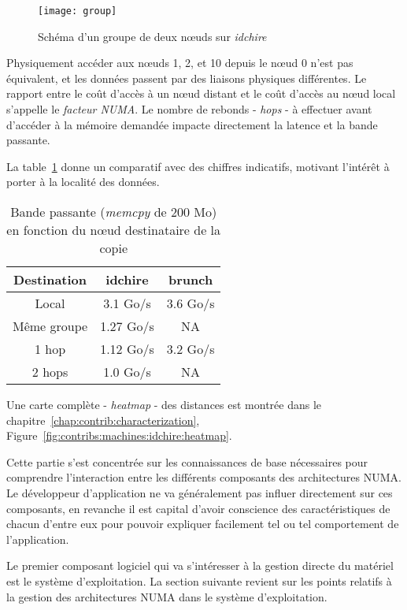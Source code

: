 \begin{figure}[ht]
  \centering
  \texttt{[image: group]}
  \caption{Schéma d'un groupe de deux nœuds sur \emph{idchire}}\label{fig:context:group-idchire}
\end{figure}


Physiquement accéder aux nœuds 1, 2, et 10 depuis le nœud 0 n'est pas équivalent, et les données passent par des liaisons physiques différentes.
Le rapport entre le coût d'accès à un nœud distant et le coût d'accès au nœud local s'appelle le \emph{facteur NUMA}.
Le nombre de rebonds - \emph{hops} - à effectuer avant d'accéder à la mémoire demandée impacte directement la latence et la bande passante.

La table~\ref{tab:topologie-hops} donne un comparatif avec des chiffres indicatifs, motivant l'intérêt à porter à la localité des données.

\begin{table}[ht]
\def\arraystretch{1.5}
\centering
\begin{tabular}{|c||c|c|}\hline
  Destination & idchire & brunch  \\ \hline
 Local & 3.1 Go/s & 3.6 Go/s \\ \hline
 Même groupe & 1.27 Go/s & NA \\ \hline
 1 hop & 1.12 Go/s & 3.2 Go/s \\ \hline
 2 hops & 1.0 Go/s & NA \\ \hline
\end{tabular}
\caption{Bande passante (\emph{memcpy} de 200 Mo) en fonction du nœud destinataire de la copie}\label{tab:topologie-hops}
\end{table}

Une carte complète - \emph{heatmap} - des distances est montrée dans le chapitre~\ref{chap:contrib:characterization}, Figure~\ref{fig:contribs:machines:idchire:heatmap}.

\bigskip

Cette partie s'est concentrée sur les connaissances de base nécessaires pour comprendre l'interaction entre les différents composants des architectures NUMA.
Le développeur d'application ne va généralement pas influer directement sur ces composants, en revanche il est capital d'avoir conscience des caractéristiques de chacun d'entre eux pour pouvoir expliquer facilement tel ou tel comportement de l'application.

Le premier composant logiciel qui va s'intéresser à la gestion directe du matériel est le système d'exploitation.
La section suivante revient sur les points relatifs à la gestion des architectures NUMA dans le système d'exploitation.
